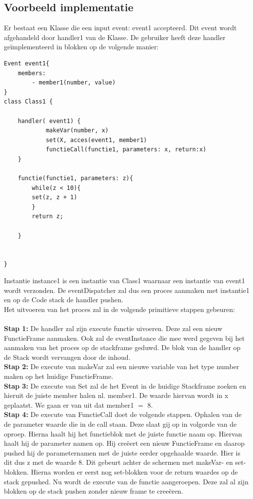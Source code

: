 \documentclass[]{article}
\begin{document}
\subsection{Voorbeeld implementatie}
\label{voorbeeldvm}
Er bestaat een Klasse die een input event: event1 accepteerd. Dit event wordt afgehandeld door handler1 van de Klasse. De gebruiker heeft deze handler ge\"{i}mplementeerd in blokken op de volgende manier:
\lstset{language=Java}
\begin{lstlisting}
Event event1{
	members:
		- member1(number, value)
}
class Class1 {

	handler( event1) {
    		makeVar(number, x)
    		set(X, acces(event1, member1)
    		functieCall(functie1, parameters: x, return:x)
	}
	
	functie(functie1, parameters: z){
		while(z < 10){
		set(z, z + 1)
		}
		return z;
			
	}
	
	
}
\end{lstlisting}
Instantie instance1 is een instantie van Class1 waarnaar een instantie van event1 wordt verzonden. De eventDispatcher zal dus een proces aanmaken met instantie1 en op de Code stack de handler pushen.\\
Het uitvoeren van het proces zal in de volgende primitieve stappen gebeuren:\\\\
\textbf{Stap 1:} De handler zal zijn execute functie uivoeren. Deze zal een nieuw FunctieFrame aanmaken. Ook zal de eventInstance die mee werd gegeven bij het aanmaken van het proces op de stackframe geduwd. De blok van de handler op de Stack wordt vervangen door de inhoud.\\
\textbf{Stap 2:} De execute van makeVar zal een nieuwe variable van het type number maken op het huidige FunctieFrame.\\
\textbf{Stap 3:} De execute van Set zal de het Event in de huidige Stackframe zoeken en hieruit de juiste member halen nl. member1. De waarde hiervan wordt in x geplaatst. We gaan er van uit dat member1 $=$ 8.\\
\textbf{Stap 4:} De execute van FunctieCall doet de volgende stappen. Ophalen van de de parameter waarde die in de call staan. Deze slaat gij op in volgorde van de oproep. Hierna haalt hij het functieblok met de juiste functie naam op. Hiervan haalt hij de parameter namen op. Hij cree\"{}ert een nieuw FunctieFrame en daarop pushed hij de parameternamen met de juiste eerder opgehaalde waarde. Hier is dit dus z met de waarde 8. Dit gebeurt achter de schermen met makeVar- en set-blokken. Hierna worden er eerst nog set-blokken voor de return waardes op de stack gepushed. Nu wordt de execute van de functie aangeroepen. Deze zal al zijn blokken op de stack pushen zonder nieuw frame te cree\"{e}ren.\\
\end{document}
